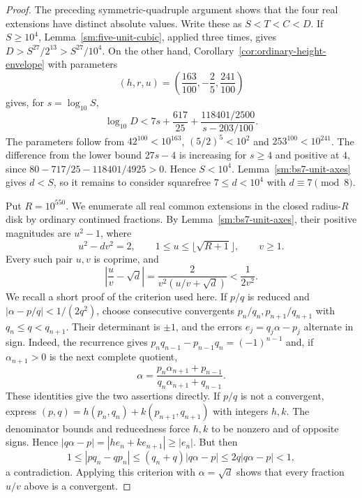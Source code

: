\documentclass[12pt]{article}
\numberwithin{equation}{section}
\begin{document}
\begin{proof}
The preceding symmetric-quadruple argument shows that the four real extensions have distinct absolute values. Write these as $S<T<C<D$. If $S\ge10^4$, Lemma~\ref{sm:five-unit-cubic}, applied three times, gives $D>S^{27}/2^{13}>S^{27}/10^4$. On the other hand, Corollary~\ref{cor:ordinary-height-envelope} with parameters
\[
 (h,r,u)=\left(\frac{163}{100},-\frac25,\frac{241}{100}\right)
\]
gives, for $s=\log_{10}S$,
\[
 \log_{10}D<7s+\frac{617}{25}
       +\frac{118401/2500}{s-203/100}.
\]
The parameters follow from $42^{100}<10^{163}$, $(5/2)^5<10^2$ and $253^{100}<10^{241}$. The difference from the lower bound $27s-4$ is increasing for $s\ge4$ and positive at $4$, since
$80-717/25-118401/4925>0$. Hence $S<10^4$.
Lemma~\ref{sm:bs7-unit-axes} gives $d<S$, so it remains to consider squarefree $7\le d<10^4$ with $d\equiv7\pmod8$.

Put $R=10^{550}$. We enumerate all real common extensions in the closed radius-$R$ disk by ordinary continued fractions. By Lemma~\ref{sm:bs7-unit-axes}, their positive magnitudes are $u^2-1$, where
\begin{equation*}
 u^2-dv^2=2,\qquad
 1\le u\le\lfloor\sqrt{R+1}\rfloor,\qquad v\ge1.
\end{equation*}
Every such pair $u,v$ is coprime, and
\begin{equation*}
 \left|\frac uv-\sqrt d\right|
 =\frac{2}{v^2(u/v+\sqrt d)}<\frac1{2v^2}.
\end{equation*}
We recall a short proof of the criterion used here. If $p/q$ is reduced
and $|\alpha-p/q|<1/(2q^2)$, choose consecutive convergents
$p_n/q_n,p_{n+1}/q_{n+1}$ with $q_n\le q<q_{n+1}$.
Their determinant is $\pm1$, and the errors
$e_j=q_j\alpha-p_j$ alternate in sign. Indeed, the recurrence gives
$p_nq_{n-1}-p_{n-1}q_n=(-1)^{n-1}$ and, if
$\alpha_{n+1}>0$ is the next complete quotient,
\[
 \alpha=\frac{p_n\alpha_{n+1}+p_{n-1}}
 {q_n\alpha_{n+1}+q_{n-1}}.
\]
These identities give the two assertions directly. If $p/q$ is not a convergent, express
$(p,q)=h(p_n,q_n)+k(p_{n+1},q_{n+1})$ with integers $h,k$.
The denominator bounds and reducedness force $h,k$ to be nonzero
and of opposite signs. Hence
$|q\alpha-p|=|h e_n+k e_{n+1}|\ge|e_n|$. But then
\[
 1\le|p q_n-q p_n|
 \le(q_n+q)|q\alpha-p|\le2q|q\alpha-p|<1,
\]
a contradiction. Applying this criterion with $\alpha=\sqrt d$
shows that every fraction $u/v$ above is a convergent.


\end{proof}
\end{document}
